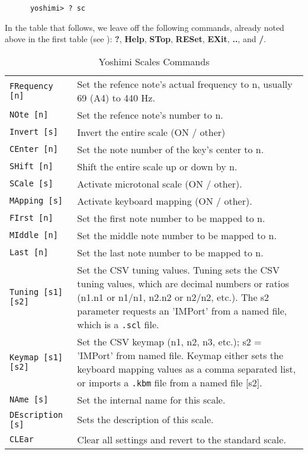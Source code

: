   \begin{verbatim}
      yoshimi> ? sc
   \end{verbatim}

   In the table that follows, we leave off the following commands, already noted
   above in the first table
   (see ):
   \textbf{?}, \textbf{Help}, \textbf{STop}, \textbf{RESet},
   \textbf{EXit}, \textbf{..}, and \textbf{/}.

\begin{center}
\begin{longtable}{p{4cm} p{10cm}}
\caption[Yoshimi Scales Commands]{Yoshimi Scales Commands} \\

\texttt{FRequency [n]} &
   Set the refence note's actual frequency to n, usually 69 (A4) to 440 Hz. \\
\texttt{NOte [n]} &
   Set the refence note's number to n. \\
\texttt{Invert [s]} &
   Invert the entire scale (ON / other) \\
\texttt{CEnter [n]} &
   Set the note number of the key's center to n. \\
\texttt{SHift [n]} &
   Shift the entire scale up or down by n. \\
\texttt{SCale [s]} &
   Activate microtonal scale (ON / other). \\
\texttt{MApping [s]} &
   Activate keyboard mapping (ON / other). \\
\texttt{FIrst [n]} &
   Set the first note number to be mapped to n. \\
\texttt{MIddle [n]} &
   Set the middle note number to be mapped to n. \\
\texttt{Last [n]} &
   Set the last note number to be mapped to n. \\
\texttt{Tuning [s1] [s2]} &
   Set the CSV tuning values.
   Tuning sets the CSV tuning values, which are decimal numbers or ratios
   (n1.n1 or n1/n1, n2.n2 or n2/n2, etc.).
   The s2 parameter requests an 'IMPort' from a named file, which is
   \index{.scl}
   \index{config!.scl}
   a \texttt{.scl} file. \\
\texttt{Keymap [s1] [s2]} &
   Set the CSV keymap (n1, n2, n3, etc.); s2 = 'IMPort' from named file.
   Keymap either sets the keyboard mapping values as a comma separated list, or
   imports a
   \index{.kbm}
   \index{config!.kbm}
   \texttt{.kbm} file from a named file [s2]. \\
\texttt{NAme [s]} &
   Set the internal name for this scale. \\
\texttt{DEscription [s]} &
   Sets the description of this scale. \\
\texttt{CLEar} &
   Clear all settings and revert to the standard scale. \\
\end{longtable}
\end{center}


